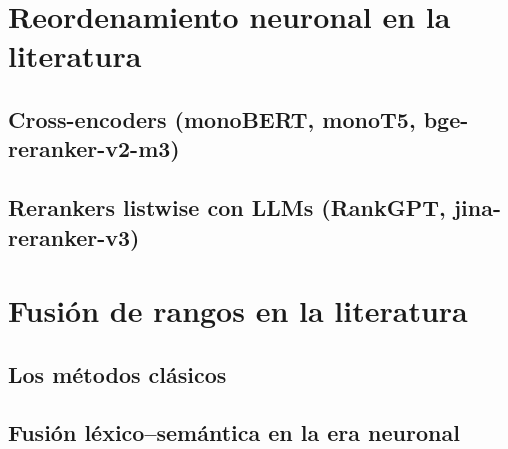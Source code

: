 \section{Reordenamiento neuronal en la literatura}\label{sec:edoarte-reranking}

\subsection{Cross-encoders (monoBERT, monoT5, bge-reranker-v2-m3)}\label{subsec:edoarte-crossencoders}

\subsection{Rerankers listwise con LLMs (RankGPT, jina-reranker-v3)}\label{subsec:edoarte-listwise}

\section{Fusión de rangos en la literatura}\label{sec:edoarte-fusion}

\subsection{Los métodos clásicos}\label{subsec:edoarte-clasicos}

\subsection{Fusión léxico--semántica en la era neuronal}\label{subsec:edoarte-era-neuronal}

